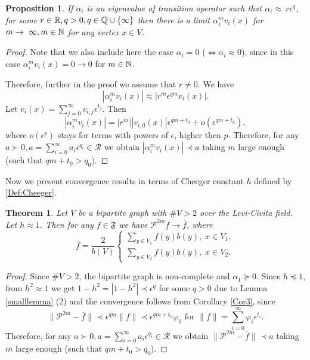 \documentclass[a4paper,12pt]{amsart}
\newtheorem{theorem}{Theorem}
\newtheorem{proposition}{Proposition}
\theoremstyle{definition}
\renewcommand{\P}{\mathcal{P}}
\newcommand{\R}{\mathcal{R}}
\newcommand{\weight}{b}
\begin{document}
\begin{proposition}\label{PropLC1}
If $\alpha_i$ is an eigenvalue of transition operator such that $\alpha_i\approx ~r\epsilon^q$, for some $r\in \Bbb R, q>0,  q\in\Bbb Q\cup\{\infty\}$ then there is a limit $\mathcal \alpha_{i}^m v_{i}(x)$ for $m\to ~\infty, m\in \Bbb N$ for any vertex $x\in V$.
\end{proposition}
\begin{proof}
Note that we also include here the case $\alpha_i=0$ ($\Leftrightarrow \alpha_i\approx 0$), since in this case $\alpha_{i}^m v_{i}(x)= 0\to 0$ for $m\in \Bbb N$.

Therefore, further in the proof we assume that $r\ne 0$. We have 
$$|\alpha_{i}^{m} v_{i}(x)|\approx |r^m\epsilon^{qm} v_i(x)|.
$$
 Let $\displaystyle v_i(x)=\sum_{j=0}^\infty v_{i,j} \epsilon^{t_j}$. Then
$$
|\alpha_{i}^{m} v_{i}(x)|=|r^m||v_{i,0}(x)|\epsilon^{qm+t_0} +o(\epsilon^{qm+t_0}),
$$
where  $o(\epsilon^p)$ stays for terms with powers of $\epsilon$, higher then $p$. Therefore, for any $a\succ 0, a=\sum_{i=0}^\infty a_i\epsilon^{q_i}\in \R$
we obtain ${|\alpha_{i}^{m} v_{i}(x)|\prec a}$  taking $m$ large enough (such that $qm+t_0>q_0$).
\end{proof}

Now we present convergence results in terms of Cheeger constant $h$ defined by \eqref{Def:Cheeger}.

\begin{theorem}\label{corhLC}
Let $V$ be a  bipartite graph with $\#V>2$ over the Levi-Civita field.
Let $h\approx 1$. Then for any $f\in \mathfrak F$ we have $\P^{2m} f\to \overline f$, where 
$$\overline f=\dfrac{2}{b(V)}
\begin{cases}
\sum_{y\in V_1} f(y)\weight (y),\; x\in V_1,\\
\sum_{y\in V_2} f(y)\weight (y),\; x\in V_2.
\end{cases}
$$
\end{theorem}
\begin{proof}

Since $\#V>2$, the bipartite graph is non-complete and $\alpha_1\succeq 0$. Since $h\preceq 1$, from $h^2\approx 1$ we get $1-h^2=|1-h^2|\prec \epsilon^q$ for some $q>0$ due to Lemma \ref{smalllemma} (2) and the convergence follows from Corollary \ref{Cor3}, since 
$$
\|\P^{2m}-\overline f\|\prec \epsilon^{qm} \|f\|\prec  \epsilon^{qm+t_0}\varphi_0 \mbox{ for } \|f\|=\sum_{i=0}^{\infty}\varphi_i \epsilon^{t_i}.
$$
Therefore, for any $a\succ 0, a=\sum_{i=0}^\infty a_i\epsilon^{q_i}\in \R$
we obtain ${\|\P^{2m}-\overline f\|\prec a}$  taking $m$ large enough (such that $qm+t_0>q_0$).
\end{proof}
\end{document}
